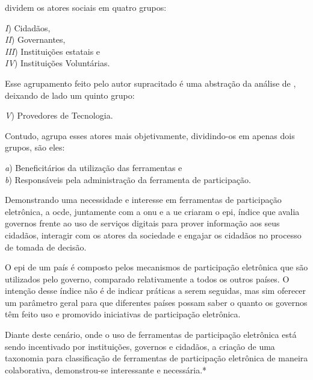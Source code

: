 \par
{} dividem os atores sociais em quatro grupos: 

\begin{minipage}{.66\textwidth}	
   \textit{I}) Cidadãos, \\
   \textit{II}) Governantes, \\
   \textit{III}) Instituições estatais e \\
   \textit{IV}) Instituições Voluntárias. \\
\end{minipage}

\par
Esse agrupamento feito pelo autor supracitado é uma abstração da análise de , deixando de lado um quinto grupo:

\par
\textit{V}) Provedores de Tecnologia.

\par
Contudo,  agrupa esses atores mais objetivamente, dividindo-os em apenas dois grupos, são eles:\\

\begin{minipage}{.75\textwidth}	
   \textit{a}) Beneficitários da utilização das ferramentas e \\
   \textit{b}) Responsáveis pela administração da ferramenta de participação.  \\
\end{minipage}

\par
Demonstrando uma necessidade e interesse em ferramentas de participação eletrônica, a \acrfull{ocde}, juntamente com a \acrshort{onu} e a \acrfull{ue} criaram o \acrfull{epi}, 
índice que avalia governos frente ao uso de serviços digitais para prover informação aos seus cidadãos, interagir com os atores da sociedade e engajar os cidadãos no processo 
de tomada de decisão. 

\par 
O \acrshort{epi} de um país é composto pelos mecanismos de participação eletrônica que são utilizados pelo governo, comparado relativamente a todos os outros países.
O intenção desse índice não é de indicar práticas a serem seguidas, mas sim oferecer um parâmetro geral para que diferentes países possam saber o quanto os governos têm
feito uso e promovido iniciativas de participação eletrônica.

\par
Diante deste cenário, onde o uso de ferramentas de participação eletrônica está sendo incentivado por instituições, governos e cidadãos, a criação de uma taxonomia para 
classificação de ferramentas de participação eletrônica de maneira colaborativa, demonstrou-se interessante e necessária.*


